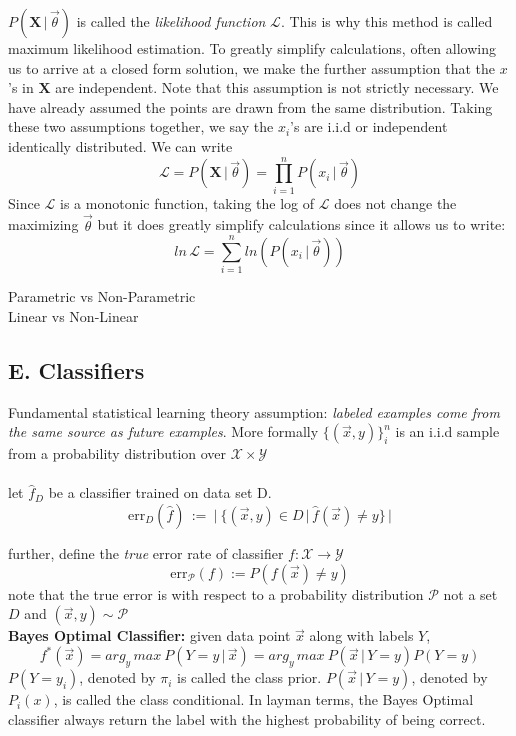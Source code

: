 \documentclass[10pt]{article}
\begin{document}
			\noindent $P(\mathbf{X} \, | \, \vec \theta)$ is called the \textit{likelihood function} $\mathcal{L}$. 
			This is why this method is called maximum likelihood estimation. To greatly simplify calculations, 
			often allowing us to arrive at a closed form solution, we make the further assumption that the 
			$x$'s in $\mathbf{X}$ are independent. Note that this assumption is not strictly necessary. We have 
			already assumed the points are drawn from the same distribution. Taking these
			two assumptions together, we say the $x_i$'s are i.i.d or independent identically distributed. We can write 
			$$\mathcal{L} = P(\mathbf{X} \, | \, \vec \theta) = \prod_{i=1}^{n}P(x_i \, | \, \vec \theta)$$
			Since $\mathcal L$ is a monotonic function, taking the log of $\mathcal L$ does not change the maximizing 
			$\vec \theta$ but it does greatly simplify calculations since it allows us to write:
			$$ln \, \mathcal L = \sum_{i=1}^{n} ln (P(x_i \, | \, \vec \theta))$$
			
			
			 Parametric vs Non-Parametric \\
			 Linear vs Non-Linear
			 
		\subsection*{E. Classifiers}
			Fundamental statistical learning theory assumption: \textit{labeled examples come from the same
			source as future examples}. More formally $ \{(\vec x, y)\}_i^n$ is an i.i.d sample from a probability
			distribution over $\mathcal{X} \times \mathcal{Y} $ \\ \\
			let $\hat f_D$ be a classifier trained on data set D. 
			$$ \textrm{err}_D(\hat f) \, := \ \lvert\  \{ (\vec x, y) \in D \, | \, \hat f(\vec x) \not = y\} \, \rvert $$ 
			
			\noindent further, define the \textit{true} error rate of classifier $f: \mathcal X\rightarrow \mathcal Y $\\
			$$\textrm{err}_{\mathcal{P}}(f) := P(f(\vec x) \not = y) $$
			note that the true error is with respect to a probability distribution $\mathcal P$ not a set $D$ and 
			$ (\vec x,  y) \sim \mathcal  P$\\
			
			\noindent \textbf{Bayes Optimal Classifier:} given data point $\vec x$ along with labels $Y$,
			$$ f^*(\vec x) = arg_y \, max \ P(Y = y\, | \, \vec x ) = arg_y \, max \ P(\vec x \, | \, Y=y)P(Y = y)$$
			$P(Y=y_i)$, denoted by $\pi_i$ is called the class prior. $P(\vec x \, | \, Y=y)$, denoted by $P_i(x)$,
			is called the class conditional. In layman terms, the Bayes Optimal classifier always return the 
			label with the highest probability of being correct. \\\
			
\end{document}
